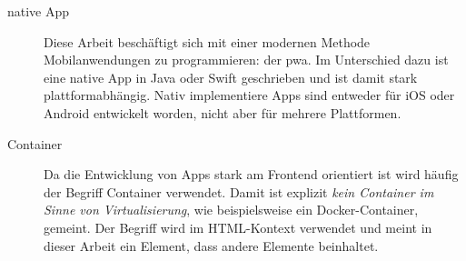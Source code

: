 \begin{description}
	\item [native App]
		Diese Arbeit beschäftigt sich mit einer modernen Methode Mobilanwendungen zu programmieren: der \ac{pwa}. Im Unterschied dazu ist eine native App in Java oder Swift geschrieben und ist damit stark plattformabhängig. Nativ implementiere Apps sind entweder für iOS oder Android entwickelt worden, nicht aber für mehrere Plattformen.
		
	\item [Container]
		Da die Entwicklung von Apps stark am Frontend orientiert ist wird häufig der Begriff Container verwendet. Damit ist explizit \textit{kein Container im Sinne von Virtualisierung}, wie beispielsweise ein Docker-Container, gemeint. Der Begriff wird im HTML-Kontext verwendet und meint in dieser Arbeit ein Element, dass andere Elemente beinhaltet.
	
\end{description}

